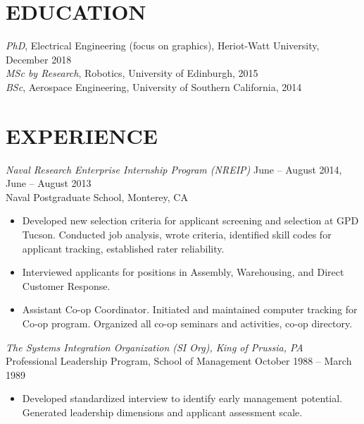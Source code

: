 \documentclass[10pt]{res} %
\begin{document}
\begin{resume}

\section{EDUCATION} 

{\sl PhD}, Electrical Engineering (focus on graphics), Heriot-Watt University, December 2018\\
\emph{MSc by Research}, Robotics, University of Edinburgh, 2015\\ 
\emph{BSc}, Aerospace Engineering, University of Southern California, 2014 


\section{EXPERIENCE}

{\sl Naval Research Enterprise Internship Program (NREIP)} \hfill June -- August 2014, June -- August 2013 \\
Naval Postgraduate School, Monterey, CA
\begin{itemize} \itemsep -2pt %
\item Developed new selection criteria for applicant screening and selection at GPD Tucson. Conducted job analysis, wrote criteria, identified skill codes for applicant tracking, established rater reliability. 
\item Interviewed applicants for positions in Assembly, Warehousing, and Direct Customer Response. 
\item Assistant Co-op Coordinator. Initiated and maintained computer tracking for Co-op program. Organized all co-op seminars and activities, co-op directory. 
\end{itemize}

{\sl The Systems Integration Organization (SI Org), King of Prussia, PA} \\[2pt]
Professional Leadership Program, School of Management \hfill October 1988 -- March 1989 
\begin{itemize} \itemsep -2pt %
\item Developed standardized interview to identify early management potential. Generated leadership dimensions and applicant assessment scale. 
\end{itemize} 
 

\end{resume}
\end{document}
